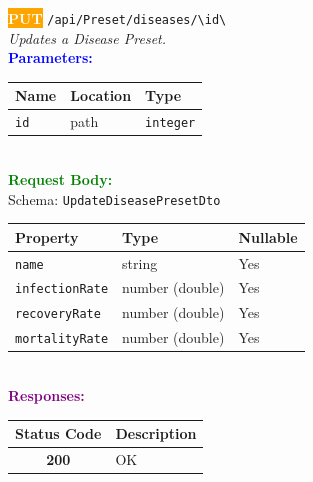 \begin{tcolorbox}[
    colback=orange!5,
    colframe=orange,
    arc=2mm,
    boxrule=1pt,
    left=5pt,
    right=5pt,
    top=5pt,
    bottom=5pt
]
\noindent\colorbox{orange}{\textcolor{white}{\textbf{PUT}}} 
\texttt{\large /api/Preset/diseases/\textbackslash{}{id\textbackslash{}}}\\[0.3em]
\textit{Updates a Disease Preset.}\\[0.3em]
\vspace{0.3em}
\textbf{\textcolor{blue}{Parameters:}}\\[0.2em]
\begin{tabular}{|l|l|l|}
\hline
\rowcolor{gray!20}
\textbf{Name} & \textbf{Location} & \textbf{Type} \\ \hline
\texttt{id} & path & \texttt{integer} \\ \hline
\end{tabular}\\[0.5em]
\vspace{0.3em}
\textbf{\textcolor{green}{Request Body:}}\\[0.2em]
Schema: \texttt{UpdateDiseasePresetDto}\\[0.3em]
\begin{tabular}{|l|l|l|}
\hline
\rowcolor{green!10}
\textbf{Property} & \textbf{Type} & \textbf{Nullable} \\ \hline
\texttt{name} & string & Yes \\ \hline
\rowcolor{gray!5}
\texttt{infectionRate} & number (double) & Yes \\ \hline
\texttt{recoveryRate} & number (double) & Yes \\ \hline
\rowcolor{gray!5}
\texttt{mortalityRate} & number (double) & Yes \\ \hline
\end{tabular}\\[0.5em]
\vspace{0.3em}
\textbf{\textcolor{purple}{Responses:}}\\[0.2em]
\begin{tabular}{|c|p{10cm}|}
\hline
\rowcolor{gray!20}
\textbf{Status Code} & \textbf{Description} \\ \hline
\colorbox{green!20}{\textbf{200}} & OK \\ \hline
\end{tabular}
\end{tcolorbox}
\vspace{0.5em}

